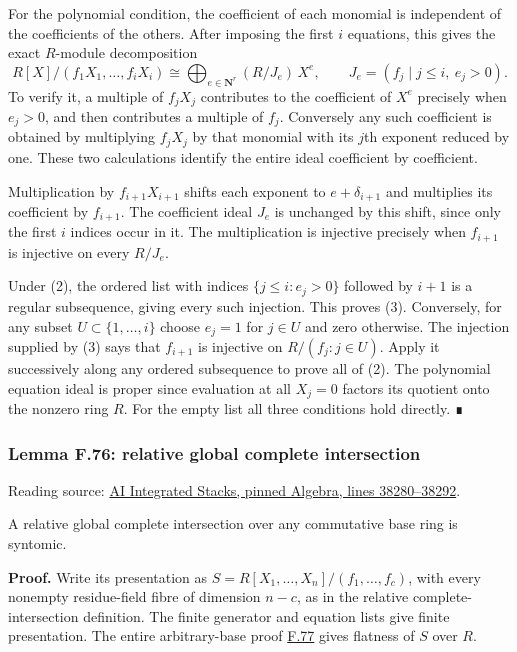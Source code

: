\documentclass[11pt,a4paper,openany]{report}
\newcounter{none}
\begin{document}
For the polynomial condition, the coefficient of each monomial is independent of the coefficients of the others. After imposing the first \(i\) equations, this gives the exact \(R\)-module decomposition \[
R[X]/(f_1X_1,\ldots,f_iX_i)
\cong\bigoplus_{e\in\mathbf N^r}(R/J_e)\,X^e,\qquad
J_e=(f_j\mid j\leq i,\ e_j>0).
\] To verify it, a multiple of \(f_jX_j\) contributes to the coefficient of \(X^e\) precisely when \(e_j>0\), and then contributes a multiple of \(f_j\). Conversely any such coefficient is obtained by multiplying \(f_jX_j\) by that monomial with its \(j\)th exponent reduced by one. These two calculations identify the entire ideal coefficient by coefficient.

Multiplication by \(f_{i+1}X_{i+1}\) shifts each exponent to \(e+\delta_{i+1}\) and multiplies its coefficient by \(f_{i+1}\). The coefficient ideal \(J_e\) is unchanged by this shift, since only the first \(i\) indices occur in it. The multiplication is injective precisely when \(f_{i+1}\) is injective on every \(R/J_e\).

Under (2), the ordered list with indices \(\{j\leq i:e_j>0\}\) followed by \(i+1\) is a regular subsequence, giving every such injection. This proves (3). Conversely, for any subset \(U\subset\{1,\ldots,i\}\) choose \(e_j=1\) for \(j\in U\) and zero otherwise. The injection supplied by (3) says that \(f_{i+1}\) is injective on \(R/(f_j:j\in U)\). Apply it successively along any ordered subsequence to prove all of (2). The polynomial equation ideal is proper since evaluation at all \(X_j=0\) factors its quotient onto the nonzero ring \(R\). For the empty list all three conditions hold directly. ∎

\label{AG-RG-S05-algebra-lemma-relative-global-complete-intersection}

\subsubsection{Lemma F.76: relative global complete intersection}\label{AG-RG-S05-lemma-f.76-relative-global-complete-intersection}

Reading source: \href{https://github.com/KokunoYumeto/unofficial-stacks-project-ai-drafts/blob/565b10e987aba5969b21145a0833f42d69f96790/algebra.tex\#L38280-L38292}{AI Integrated Stacks, pinned Algebra, lines 38280--38292}.

A relative global complete intersection over any commutative base ring is syntomic.

\textbf{Proof.} Write its presentation as \(S=R[X_1,\ldots,X_n]/(f_1,\ldots,f_c)\), with every nonempty residue-field fibre of dimension \(n-c\), as in the relative complete-intersection definition. The finite generator and equation lists give finite presentation. The entire arbitrary-base proof \hyperref[AG-RG-S05-algebra-lemma-relative-global-complete-intersection-conormal]{F.77} gives flatness of \(S\) over \(R\).
\end{document}
